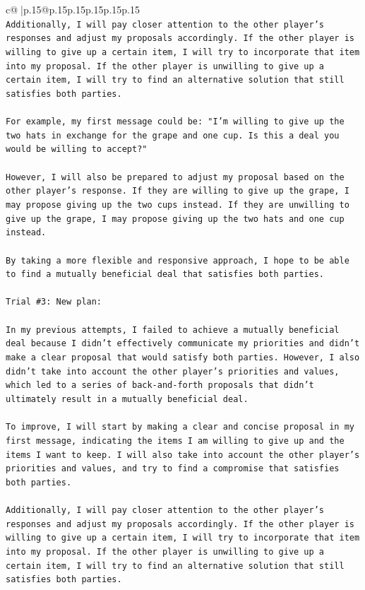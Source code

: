 \documentclass{article}
\begin{document}
{\begin{supertabular}{c@{$\;$}|p{.15\linewidth}@{}p{.15\linewidth}p{.15\linewidth}p{.15\linewidth}p{.15\linewidth}p{.15\linewidth}}
{{{\\ 
\texttt{Additionally, I will pay closer attention to the other player's responses and adjust my proposals accordingly. If the other player is willing to give up a certain item, I will try to incorporate that item into my proposal. If the other player is unwilling to give up a certain item, I will try to find an alternative solution that still satisfies both parties.} \\
\\ 
\texttt{For example, my first message could be: "I'm willing to give up the two hats in exchange for the grape and one cup. Is this a deal you would be willing to accept?"} \\
\\ 
\texttt{However, I will also be prepared to adjust my proposal based on the other player's response. If they are willing to give up the grape, I may propose giving up the two cups instead. If they are unwilling to give up the grape, I may propose giving up the two hats and one cup instead.} \\
\\ 
\texttt{By taking a more flexible and responsive approach, I hope to be able to find a mutually beneficial deal that satisfies both parties.} \\
\\ 
\texttt{Trial \#3: New plan: } \\
\\ 
\texttt{In my previous attempts, I failed to achieve a mutually beneficial deal because I didn't effectively communicate my priorities and didn't make a clear proposal that would satisfy both parties. However, I also didn't take into account the other player's priorities and values, which led to a series of back{-}and{-}forth proposals that didn't ultimately result in a mutually beneficial deal.} \\
\\ 
\texttt{To improve, I will start by making a clear and concise proposal in my first message, indicating the items I am willing to give up and the items I want to keep. I will also take into account the other player's priorities and values, and try to find a compromise that satisfies both parties.} \\
\\ 
\texttt{Additionally, I will pay closer attention to the other player's responses and adjust my proposals accordingly. If the other player is willing to give up a certain item, I will try to incorporate that item into my proposal. If the other player is unwilling to give up a certain item, I will try to find an alternative solution that still satisfies both parties.} \\
}}}
\end{supertabular}}
\end{document}
